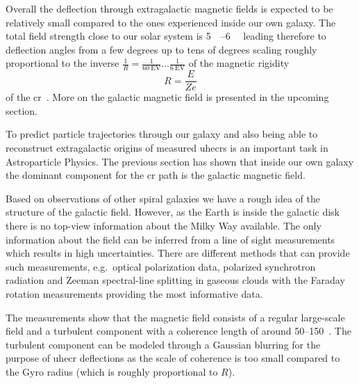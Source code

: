 Overall the deflection through extragalactic magnetic fields is expected to be relatively small compared to the ones experienced inside our own galaxy. The total field strength close to our solar system is \SIrange{5}{6}{\micro\gauss} leading therefore to deflection angles from a few degrees up to tens of degrees scaling roughly proportional to the inverse \(\frac1R=\frac1{\SI{60}{\exa\volt}}\ldots\frac1{\SI{6}{\exa\volt}}\) of the magnetic rigidity \begin{equation}
    R = \frac{E}{Z e}
\end{equation} of the \gls{cr}~\cite{Opher2013}. More on the galactic magnetic field is presented in the upcoming section.

\label{sssec:jf12}

To predict particle trajectories through our galaxy and also being able to reconstruct extragalactic origins of measured \glspl{uhecr} is an important task in Astroparticle Physics. The previous section has shown that inside our own galaxy the dominant component for the \gls{cr} path is the galactic magnetic field.

Based on observations of other spiral galaxies we have a rough idea of the structure of the galactic field. However, as the Earth is inside the galactic disk there is no top-view information about the Milky Way available. The only information about the field can be inferred from a line of sight measurements which results in high uncertainties. There are different methods that can provide such measurements, e.g.\ optical polarization data, polarized synchrotron radiation and Zeeman spectral-line splitting in gaseous clouds with the Faraday rotation measurements providing the most informative data.~\cite{Beck2015}

The measurements show that the magnetic field consists of a regular large-scale field and a turbulent component with a coherence length of around \SIrange{50}{150}{\parsec}~\cite{Prouza2003}. The turbulent component can be modeled through a Gaussian blurring for the purpose of \gls{uhecr} deflections as the scale of coherence is too small compared to the Gyro radius (which is roughly proportional to \(R\)).

